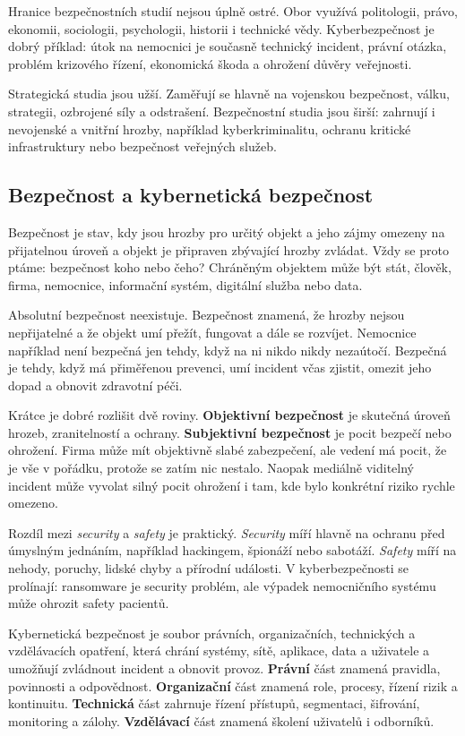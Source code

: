 \documentclass[11pt,a4paper]{article}
\begin{document}
Hranice bezpečnostních studií nejsou úplně ostré. Obor využívá politologii, právo, ekonomii, sociologii, psychologii, historii i technické vědy. Kyberbezpečnost je dobrý příklad: útok na nemocnici je současně technický incident, právní otázka, problém krizového řízení, ekonomická škoda a ohrožení důvěry veřejnosti.

Strategická studia jsou užší. Zaměřují se hlavně na vojenskou bezpečnost, válku, strategii, ozbrojené síly a odstrašení. Bezpečnostní studia jsou širší: zahrnují i nevojenské a vnitřní hrozby, například kyberkriminalitu, ochranu kritické infrastruktury nebo bezpečnost veřejných služeb.

\subsection*{Bezpečnost a kybernetická bezpečnost}
Bezpečnost je stav, kdy jsou hrozby pro určitý objekt a jeho zájmy omezeny na přijatelnou úroveň a objekt je připraven zbývající hrozby zvládat. Vždy se proto ptáme: bezpečnost koho nebo čeho? Chráněným objektem může být stát, člověk, firma, nemocnice, informační systém, digitální služba nebo data.

Absolutní bezpečnost neexistuje. Bezpečnost znamená, že hrozby nejsou nepřijatelné a že objekt umí přežít, fungovat a dále se rozvíjet. Nemocnice například není bezpečná jen tehdy, když na ni nikdo nikdy nezaútočí. Bezpečná je tehdy, když má přiměřenou prevenci, umí incident včas zjistit, omezit jeho dopad a obnovit zdravotní péči.

Krátce je dobré rozlišit dvě roviny. \textbf{Objektivní bezpečnost} je skutečná úroveň hrozeb, zranitelností a ochrany. \textbf{Subjektivní bezpečnost} je pocit bezpečí nebo ohrožení. Firma může mít objektivně slabé zabezpečení, ale vedení má pocit, že je vše v pořádku, protože se zatím nic nestalo. Naopak mediálně viditelný incident může vyvolat silný pocit ohrožení i tam, kde bylo konkrétní riziko rychle omezeno.

Rozdíl mezi \emph{security} a \emph{safety} je praktický. \emph{Security} míří hlavně na ochranu před úmyslným jednáním, například hackingem, špionáží nebo sabotáží. \emph{Safety} míří na nehody, poruchy, lidské chyby a přírodní události. V kyberbezpečnosti se prolínají: ransomware je security problém, ale výpadek nemocničního systému může ohrozit safety pacientů.

Kybernetická bezpečnost je soubor právních, organizačních, technických a vzdělávacích opatření, která chrání systémy, sítě, aplikace, data a uživatele a umožňují zvládnout incident a obnovit provoz. \textbf{Právní} část znamená pravidla, povinnosti a odpovědnost. \textbf{Organizační} část znamená role, procesy, řízení rizik a kontinuitu. \textbf{Technická} část zahrnuje řízení přístupů, segmentaci, šifrování, monitoring a zálohy. \textbf{Vzdělávací} část znamená školení uživatelů i odborníků.
\end{document}
